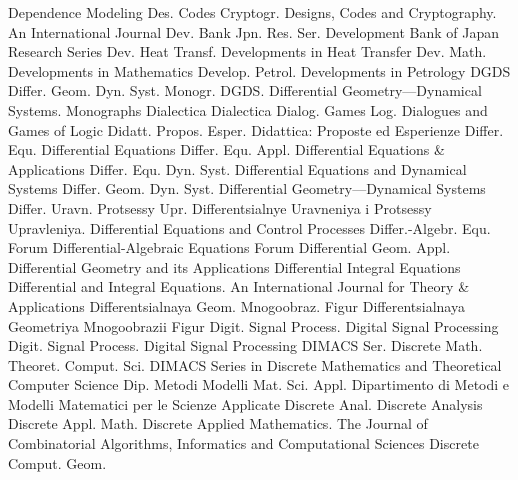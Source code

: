 {Dependence Modeling}
{Des. Codes Cryptogr.}
{Designs, Codes and Cryptography. An International Journal}
{Dev. Bank Jpn. Res. Ser.}
{Development Bank of Japan Research Series}
{Dev. Heat Transf.}
{Developments in Heat Transfer}
{Dev. Math.}
{Developments in Mathematics}
{Develop. Petrol.}
{Developments in Petrology}
{DGDS Differ. Geom. Dyn. Syst. Monogr.}
{DGDS. Differential Geometry---Dynamical Systems. Monographs}
{Dialectica}
{Dialectica}
{Dialog. Games Log.}
{Dialogues and Games of Logic}
{Didatt. Propos. Esper.}
{Didattica: Proposte ed Esperienze}
{Differ. Equ.}
{Differential Equations}
{Differ. Equ. Appl.}
{Differential Equations & Applications}
{Differ. Equ. Dyn. Syst.}
{Differential Equations and Dynamical Systems}
{Differ. Geom. Dyn. Syst.}
{Differential Geometry---Dynamical Systems}
{Differ. Uravn. Protsessy Upr.}
{Differentsialnye Uravneniya i Protsessy Upravleniya. Differential Equations and Control Processes}
{Differ.-Algebr. Equ. Forum}
{Differential-Algebraic Equations Forum}
{Differential Geom. Appl.}
{Differential Geometry and its Applications}
{Differential Integral Equations}
{Differential and Integral Equations. An International Journal for Theory & Applications}
{Differentsialnaya Geom. Mnogoobraz. Figur}
{Differentsialnaya Geometriya Mnogoobrazii Figur}
{Digit. Signal Process.}
{Digital Signal Processing}
{Digit. Signal Process.}
{Digital Signal Processing}
{DIMACS Ser. Discrete Math. Theoret. Comput. Sci.}
{DIMACS Series in Discrete Mathematics and Theoretical Computer Science}
{Dip. Metodi Modelli Mat. Sci. Appl.}
{Dipartimento di Metodi e Modelli Matematici per le Scienze Applicate}
{Discrete Anal.}
{Discrete Analysis}
{Discrete Appl. Math.}
{Discrete Applied Mathematics. The Journal of Combinatorial Algorithms, Informatics and Computational Sciences}
{Discrete Comput. Geom.}
